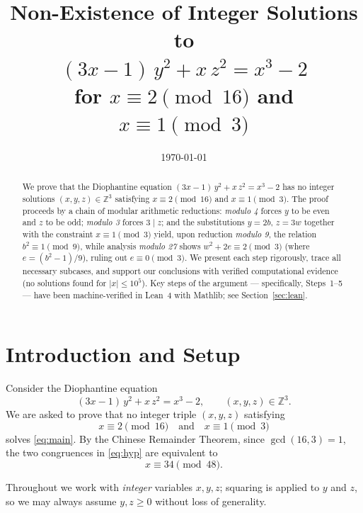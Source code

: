 \documentclass[12pt,a4paper]{article}
\title{Non-Existence of Integer Solutions to\\
$(3x-1)\,y^2 + x\,z^2 = x^3 - 2$\\
for $x \equiv 2 \pmod{16}$ and $x \equiv 1 \pmod{3}$}
\author{}
\date{\today}
\begin{document}
\maketitle

\begin{abstract}
We prove that the Diophantine equation $(3x-1)\,y^2 + x\,z^2 = x^3 - 2$
has no integer solutions $(x, y, z) \in \mathbb{Z}^3$ satisfying
$x \equiv 2 \pmod{16}$ and $x \equiv 1 \pmod{3}$.
The proof proceeds by a chain of modular arithmetic reductions:
\emph{modulo 4} forces $y$ to be even and $z$ to be odd; \emph{modulo 3}
forces $3 \mid z$; and the substitutions $y = 2b$, $z = 3w$ together with
the constraint $x \equiv 1 \pmod 3$ yield, upon reduction \emph{modulo 9},
the relation $b^2 \equiv 1 \pmod{9}$, while analysis \emph{modulo 27}
shows $w^2 + 2e \equiv 2 \pmod 3$ (where $e = (b^2-1)/9$), ruling out
$e \equiv 0 \pmod 3$.
We present each step rigorously, trace all necessary subcases, and support our
conclusions with verified computational evidence (no solutions found for
$|x| \leq 10^5$).
Key steps of the argument --- specifically, Steps~1--5 --- have been
machine-verified in Lean~4 with Mathlib; see Section~\ref{sec:lean}.
\end{abstract}

\tableofcontents
\bigskip

\section{Introduction and Setup}

Consider the Diophantine equation
\begin{equation}\label{eq:main}
  (3x-1)\,y^2 + x\,z^2 = x^3 - 2, \qquad (x,y,z)\in\mathbb{Z}^3.
\end{equation}
We are asked to prove that no integer triple $(x,y,z)$ satisfying
\begin{equation}\label{eq:hyp}
  x \equiv 2 \pmod{16} \quad\text{and}\quad x \equiv 1 \pmod{3}
\end{equation}
solves \eqref{eq:main}. By the Chinese Remainder Theorem, since
$\gcd(16,3)=1$, the two congruences in \eqref{eq:hyp} are equivalent to
\begin{equation}\label{eq:crt}
  x \equiv 34 \pmod{48}.
\end{equation}

Throughout we work with \emph{integer} variables $x, y, z$; squaring is applied to $y$ and $z$, so we may always assume $y, z \geq 0$ without loss of generality.
\end{document}
